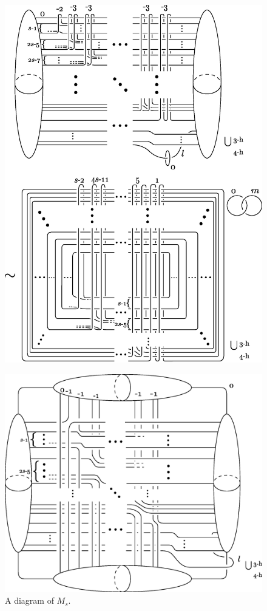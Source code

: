 \documentclass{amsart}
\theoremstyle{plain}
\theoremstyle{definition}
\begin{document}
\begin{figure}[htbp]
\begin{center}
\includegraphics[width=145mm]{movesT_s.eps}
\end{center}
\caption{}
\label{movesT_s}
\end{figure}

\begin{figure}[htbp]
\begin{center}
\includegraphics[width=145mm]{T_smfd.eps}
\end{center}
\caption{A diagram of $M_s$. }
\label{T_smfd}
\end{figure}
\end{document}
